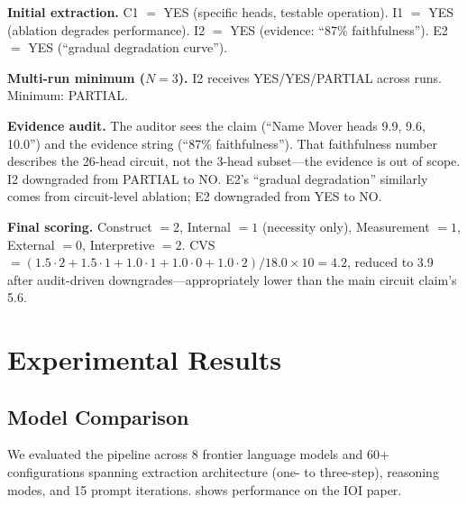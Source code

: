 \documentclass[10pt]{article}
\begin{document}
\textbf{Initial extraction.} C1 $=$ YES (specific heads, testable operation). I1 $=$ YES (ablation degrades performance). I2 $=$ YES (evidence: ``87\% faithfulness''). E2 $=$ YES (``gradual degradation curve'').

\textbf{Multi-run minimum ($N=3$).} I2 receives YES/YES/PARTIAL across runs. Minimum: PARTIAL.

\textbf{Evidence audit.} The auditor sees the claim (``Name Mover heads 9.9, 9.6, 10.0'') and the evidence string (``87\% faithfulness''). That faithfulness number describes the 26-head circuit, not the 3-head subset---the evidence is out of scope. I2 downgraded from PARTIAL to NO. E2's ``gradual degradation'' similarly comes from circuit-level ablation; E2 downgraded from YES to NO.

\textbf{Final scoring.} Construct $= 2$, Internal $= 1$ (necessity only), Measurement $= 1$, External $= 0$, Interpretive $= 2$. CVS $= (1.5 \cdot 2 + 1.5 \cdot 1 + 1.0 \cdot 1 + 1.0 \cdot 0 + 1.0 \cdot 2) / 18.0 \times 10 = 4.2$, reduced to 3.9 after audit-driven downgrades---appropriately lower than the main circuit claim's 5.6.

\section{Experimental Results}
\label{sec:results}

\subsection{Model Comparison}

We evaluated the pipeline across 8 frontier language models and 60+ configurations spanning extraction architecture (one- to three-step), reasoning modes, and 15 prompt iterations.  shows performance on the IOI paper.

\end{document}
